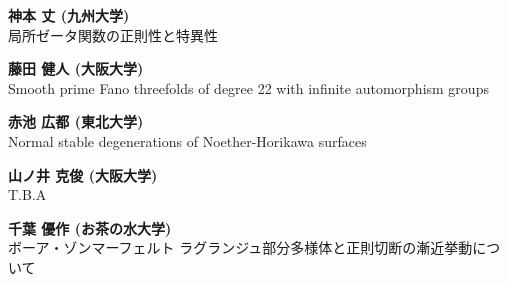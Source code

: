 \documentclass[dvipdfmx,a4paper,12pt]{article}
\theoremstyle{plain} %
\theoremstyle{definition} %
\begin{document}
{\bf 神本 丈 (九州大学)}\\
局所ゼータ関数の正則性と特異性

\vskip5mm

\vskip1mm
{\bf 藤田 健人 (大阪大学)}\\
Smooth prime Fano threefolds of degree 22 with infinite automorphism groups 
\vskip3mm

{\bf 赤池 広都 (東北大学)}\\
Normal stable degenerations of Noether-Horikawa surfaces
\vskip3mm

{\bf 山ノ井 克俊 (大阪大学) }\\
T.B.A
\vskip3mm

{\bf 千葉 優作 (お茶の水大学)}\\
ボーア・ゾンマーフェルト ラグランジュ部分多様体と正則切断の漸近挙動について

\newpage 

\end{document}
